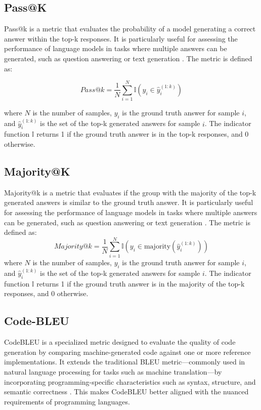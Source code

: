 \subsection{Pass@K}

Pass@k is a metric that evaluates the probability of a model generating a correct answer within the top-k responses. It is particularly useful for assessing the performance of language models in tasks where multiple answers can be generated, such as question answering or text generation \cite{Levi2024SimpleModelInferenceScalingLaws}. The metric is defined as:

\begin{equation}
    Pass@k = \frac{1}{N} \sum_{i=1}^{N} \mathbb{I}(y_i \in \hat{y}_i^{(1:k)})
\end{equation}

where \(N\) is the number of samples, \(y_i\) is the ground truth answer for sample \(i\), and \(\hat{y}_i^{(1:k)}\) is the set of the top-k generated answers for sample \(i\). The indicator function \(\mathbb{I}\) returns 1 if the ground truth answer is in the top-k responses, and 0 otherwise.

\subsection{Majority@K}

Majority@k is a metric that evaluates if the group with the majority of the top-k generated answers is similar to the ground truth answer. It is particularly useful for assessing the performance of language models in tasks where multiple answers can be generated, such as question answering or text generation \cite{Wang2023SelfConsistency}. The metric is defined as:
\begin{equation}
    Majority@k = \frac{1}{N} \sum_{i=1}^{N} \mathbb{I}(y_i \in \text{majority}(\hat{y}_i^{(1:k)}))
\end{equation}
where \(N\) is the number of samples, \(y_i\) is the ground truth answer for sample \(i\), and \(\hat{y}_i^{(1:k)}\) is the set of the top-k generated answers for sample \(i\). The indicator function \(\mathbb{I}\) returns 1 if the ground truth answer is in the majority of the top-k responses, and 0 otherwise.


\subsection{Code-BLEU}

CodeBLEU is a specialized metric designed to evaluate the quality of code generation by comparing machine-generated code against one or more reference implementations. It extends the traditional BLEU metric—commonly used in natural language processing for tasks such as machine translation—by incorporating programming-specific characteristics such as syntax, structure, and semantic correctness \cite{Ren2020CodeBLEU}. This makes CodeBLEU better aligned with the nuanced requirements of programming languages.

